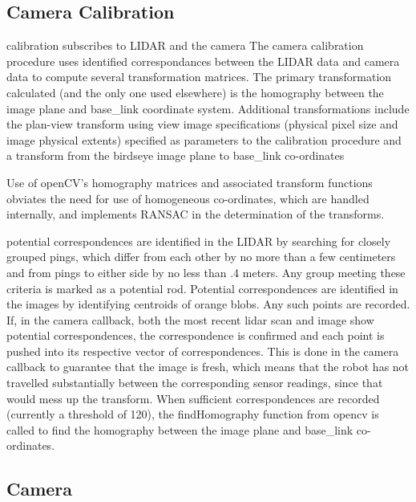 \documentclass{article}
\begin{document}
\subsection{Camera Calibration}
calibration subscribes to LIDAR and the camera
The camera calibration procedure uses identified correspondances between the LIDAR data and camera data to compute several transformation matrices.
The primary transformation calculated (and the only one used elsewhere) is the homography between the image plane and base_link coordinate system.
Additional transformations include the plan-view transform using view image specifications (physical pixel size and image physical extents) specified as parameters to the calibration procedure and a transform from the birdseye image plane to base_link co-ordinates

Use of openCV's homography matrices and associated transform functions obviates the need for use of homogeneous co-ordinates, which are handled internally, and 	implements RANSAC in the determination of the transforms.

potential correspondences are identified in the LIDAR by searching for closely grouped pings, which differ from each other by no more than a few centimeters and from pings to either side by no less than .4 meters.  Any group meeting these criteria is marked as a potential rod.
Potential correspondences are identified in the images by identifying centroids of orange blobs.  Any such points are recorded.
If, in the camera callback, both the most recent lidar scan and image show potential correspondences, the correspondence is confirmed and each point is pushed into its respective vector of correspondences.  This is done in the camera callback to guarantee that the image is fresh, which means that the robot has not travelled substantially between the corresponding sensor readings, since that would mess up the transform.
When sufficient correspondences are recorded (currently a threshold of 120), the findHomography function from opencv is called to find the homography between the image plane and base_link co-ordinates.

\subsection{Camera}
\end{document}

